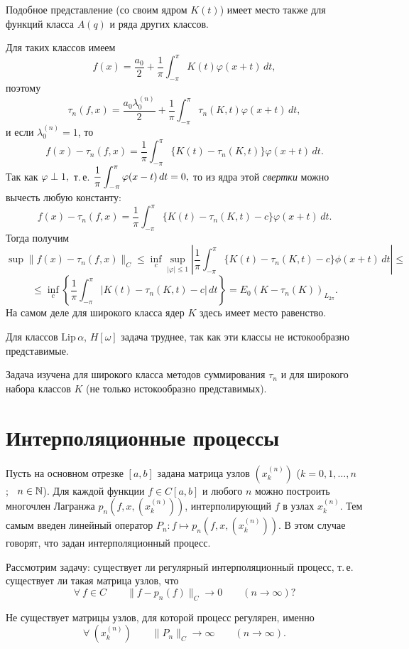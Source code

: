 Подобное представление {(со своим ядром $K(t)$)} имеет место {также} для функций класса
$A(q)$ {и ряда других классов}.

{Для таких классов имеем}
$$
{f(x)=\frac{a_0}{2}+\frac{1}{\pi}\int_{-\pi}^{\pi} K(t)\varphi(x+t)\, dt,}
$$
поэтому
$$
\tau_n(f,x)= \frac{a_0 \lambda_0^{(n)}}{2}+\frac{1}{\pi} \int_{-\pi}^{\pi}
{\tau_n(K,t)}\varphi(x+t)\,
dt,
$$
и если $\lambda_0^{(n)}=1$, то
$$
f(x)-\tau_n(f,x)=\frac{1}{\pi} \int_{-\pi}^{\pi}
\{K(t)-\tau_n(K,t)\} \varphi(x+t)\, dt.
$$
Так как $\varphi \perp 1,$ т.\,е. $\dfrac{1}{\pi}\displaystyle\int_{-\pi}^{\pi} \varphi(x-t)\,
dt=0,$ то из ядра этой {\it свертки} можно вычесть любую
константу:
$$
f(x)-\tau_n(f,x)=\frac{1}{\pi}\int_{-\pi}^\pi
\{ {K(t)-\tau_n(K,t)}-c\}\varphi(x+t)\, dt.
$$
Тогда получим
$$
\sup \|f(x)-\tau_n(f,x)\|_C\le \inf_c \sup_{|\varphi|\le 1}
\left| \frac{1}{\pi} \int_{-\pi}^\pi \{ {K(t)-\tau_n(K,t)}-c\}
\phi(x+t)\, dt \right| \le
$$
$$
\le \inf_c \left\{ \frac{1}{\pi} \int_{-\pi}^\pi
|{K(t)-\tau_n(K,t)}-c|\, dt\right\}=E_0({K-\tau_n(K)})_{{L_{2\pi}}}.
$$
На самом деле для широкого класса ядер $K$
здесь имеет место равенство.

Для классов $\mathrm{Lip}\,\alpha$, {$H[\omega]$} задача труднее, {так как эти
классы не истокообразно представимые.}

Задача изучена для широкого класса методов суммирования $\tau_n$ и для
широкого набора классов $K$ {(не только истокообразно представимых).}


\section{Интерполяционные процессы}

Пусть на основном отрезке $[a,b]$ задана матрица узлов $(x_k^{(n)})$
{($k=0,1,\ldots,n$;~ $n\in \mathbb{N}$)}. Для каждой функции $f{\in
C[a,b]}$ и любого $n$ можно построить многочлен Лагранжа $p_n(f,x,(x_k^{(n)}))$,
интерполирующий $f$ в узлах $x_k^{(n)}$. Тем самым введен линейный оператор
$P_n\colon f \mapsto p_n(f,x,(x_k^{(n)}))$. В этом случае говорят, что задан интерполяционный процесс.

Рассмотрим задачу: {существует ли регулярный
интерполяционный процесс, т.\,е.} существует ли такая матрица
узлов, что
$$
\forall\ f\in C\qquad \|f-p_n(f)\|_C \to 0\qquad (n\to \infty)?
$$

\begin{teo}[Г.\,Фабер]
Не существует матрицы узлов, для которой  процесс регулярен, именно
$$
\forall\ (x_k^{(n)})\qquad \|P_n\|_C \to \infty\qquad (n\to \infty).
$$
\end{teo}

